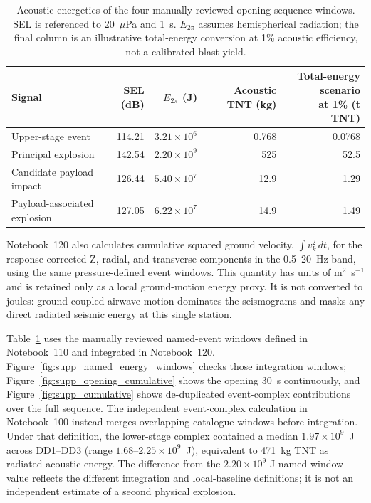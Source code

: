 \documentclass[]{seismica}
\begin{document}
\begin{table}[!tbp]
\centering
\small
\caption{Acoustic energetics of the four manually reviewed opening-sequence
windows. SEL is referenced to 20~$\mu$Pa and 1~s. $E_{2\pi}$ assumes
hemispherical radiation; the final column is an illustrative total-energy
conversion at 1\% acoustic efficiency, not a calibrated blast yield.}
\label{tab:supp_energetics}
\begin{tabularx}{\textwidth}{Xrrrr}
\hline
Signal & SEL (dB) & $E_{2\pi}$ (J) & Acoustic TNT (kg) &
\shortstack{Total-energy scenario\\at 1\% (t TNT)} \\
\hline
Upper-stage event       & 114.21 & $3.21\times10^6$ & 0.768 & 0.0768 \\
Principal explosion     & 142.54 & $2.20\times10^9$ & 525   & 52.5 \\
Candidate payload impact & 126.44 & $5.40\times10^7$ & 12.9  & 1.29 \\
Payload-associated explosion & 127.05 & $6.22\times10^7$ & 14.9  & 1.49 \\
\hline
\end{tabularx}
\end{table}

Notebook~120 also calculates cumulative squared ground velocity,
$\int v_k^2\,dt$, for the response-corrected Z, radial, and transverse
components in the 0.5--20~Hz band, using the same pressure-defined event
windows. This quantity has units of m$^2$~s$^{-1}$ and is retained only as a
local ground-motion energy proxy. It is not converted to joules:
ground-coupled-airwave motion dominates the seismograms and masks any direct
radiated seismic energy at this single station.

Table~\ref{tab:supp_energetics} uses the manually reviewed named-event windows
defined in Notebook~110 and integrated in Notebook~120.
Figure~\ref{fig:supp_named_energy_windows} checks those integration windows;
Figure~\ref{fig:supp_opening_cumulative} shows the opening 30~s continuously,
and Figure~\ref{fig:supp_cumulative} shows de-duplicated event-complex
contributions over the full sequence. The independent
event-complex calculation in Notebook~100 instead merges overlapping catalogue
windows before integration. Under that definition, the lower-stage complex
contained a median $1.97\times10^9$~J across DD1--DD3 (range
$1.68$--$2.25\times10^9$~J), equivalent to 471~kg TNT as radiated acoustic
energy. The difference from the $2.20\times10^9$-J named-window value reflects
the different integration and local-baseline definitions; it is not an
independent estimate of a second physical explosion.
\end{document}

